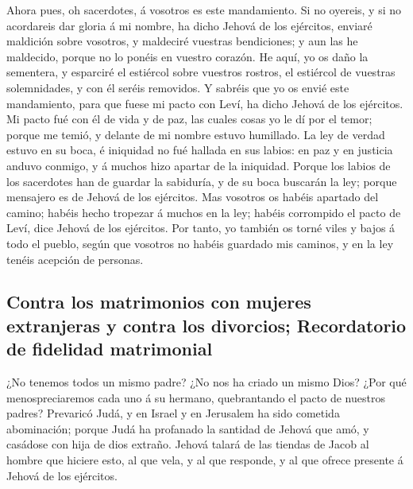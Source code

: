  Ahora pues, oh sacerdotes, á vosotros es este mandamiento.
 Si no oyereis, y si no acordareis dar gloria á mi nombre,
ha dicho Jehová de los ejércitos, enviaré maldición sobre vosotros, y
maldeciré vuestras bendiciones; y aun las he maldecido, porque no lo
ponéis en vuestro corazón.  He aquí, yo os daño la
sementera, y esparciré el estiércol sobre vuestros rostros, el estiércol
de vuestras solemnidades, y con él seréis removidos.  Y
sabréis que yo os envié este mandamiento, para que fuese mi pacto con
Leví, ha dicho Jehová de los ejércitos.  Mi pacto fué con él
de vida y de paz, las cuales cosas yo le dí por el temor; porque me
temió, y delante de mi nombre estuvo humillado.  La ley de
verdad estuvo en su boca, é iniquidad no fué hallada en sus labios: en
paz y en justicia anduvo conmigo, y á muchos hizo apartar de la
iniquidad.  Porque los labios de los sacerdotes han de
guardar la sabiduría, y de su boca buscarán la ley; porque mensajero es
de Jehová de los ejércitos.  Mas vosotros os habéis apartado
del camino; habéis hecho tropezar á muchos en la ley; habéis corrompido
el pacto de Leví, dice Jehová de los ejércitos.  Por tanto,
yo también os torné viles y bajos á todo el pueblo, según que vosotros
no habéis guardado mis caminos, y en la ley tenéis acepción de personas.

\hypertarget{contra-los-matrimonios-con-mujeres-extranjeras-y-contra-los-divorcios-recordatorio-de-fidelidad-matrimonial}{%
\subsection{Contra los matrimonios con mujeres extranjeras y contra los
divorcios; Recordatorio de fidelidad
matrimonial}\label{contra-los-matrimonios-con-mujeres-extranjeras-y-contra-los-divorcios-recordatorio-de-fidelidad-matrimonial}}

 ¿No tenemos todos un mismo padre? ¿No nos ha criado un
mismo Dios? ¿Por qué menospreciaremos cada uno á su hermano,
quebrantando el pacto de nuestros padres?  Prevaricó Judá,
y en Israel y en Jerusalem ha sido cometida abominación; porque Judá ha
profanado la santidad de Jehová que amó, y casádose con hija de dios
extraño.  Jehová talará de las tiendas de Jacob al hombre
que hiciere esto, al que vela, y al que responde, y al que ofrece
presente á Jehová de los ejércitos.


